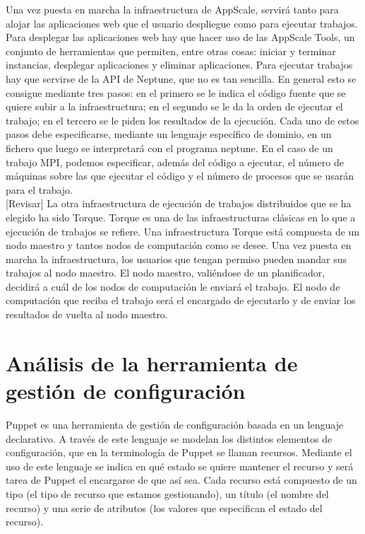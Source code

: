 Una vez puesta en marcha la infraestructura de AppScale, servirá tanto para alojar las aplicaciones web que el usuario despliegue como para ejecutar trabajos. Para desplegar las aplicaciones web hay que hacer uso de las AppScale Tools, un conjunto de herramientas que permiten, entre otras cosas: iniciar y terminar instancias, desplegar aplicaciones y eliminar aplicaciones. Para ejecutar trabajos hay que servirse de la API de Neptune, que no es tan sencilla. En general esto se consigue mediante tres pasos: en el primero se le indica el código fuente que se quiere subir a la infraestructura; en el segundo se le da la orden de ejecutar el trabajo; en el tercero se le piden los resultados de la ejecución. Cada uno de estos pasos debe especificarse, mediante un lenguaje específico de dominio, en un fichero que luego se interpretará con el programa neptune. En el caso de un trabajo MPI, podemos especificar, además del código a ejecutar, el número de máquinas sobre las que ejecutar el código y el número de procesos que se usarán para el trabajo.\\

[Revisar]
La otra infraestructura de ejecución de trabajos distribuidos que se ha elegido ha sido Torque. Torque es una de las infraestructuras clásicas en lo que a ejecución de trabajos se refiere. Una infraestructura Torque está compuesta de un nodo maestro y tantos nodos de computación como se desee. Una vez puesta en marcha la infraestructura, los usuarios que tengan permiso pueden mandar sus trabajos al nodo maestro. El nodo maestro, valiéndose de un planificador, decidirá a cuál de los nodos de computación le enviará el trabajo. El nodo de computación que reciba el trabajo será el encargado de ejecutarlo y de enviar los resultados de vuelta al nodo maestro.


\section{Análisis de la herramienta de gestión de configuración}

Puppet es una herramienta de gestión de configuración basada en un lenguaje declarativo. A través de este lenguaje se modelan los distintos elementos de configuración, que en la terminología de Puppet se llaman recursos. Mediante el uso de este lenguaje se indica en qué estado se quiere mantener el recurso y será tarea de Puppet el encargarse de que así sea. Cada recurso está compuesto de un tipo (el tipo de recurso que estamos gestionando), un título (el nombre del recurso) y una serie de atributos (los valores que especifican el estado del recurso). 

